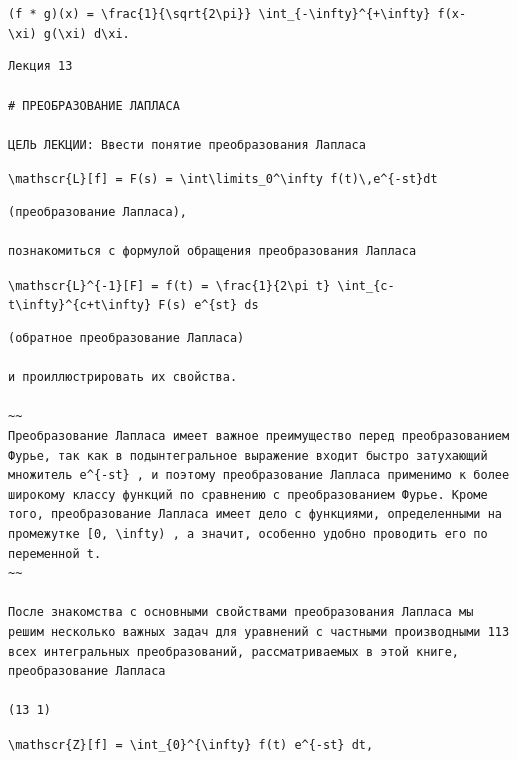 \documentclass[
  ukrainian,
]{article}
\begin{document}
\texttt{(f\ *\ g)(x)\ =\ \textbackslash{}frac\{1\}\{\textbackslash{}sqrt\{2\textbackslash{}pi\}\}\ \textbackslash{}int\_\{-\textbackslash{}infty\}\^{}\{+\textbackslash{}infty\}\ f(x-\textbackslash{}xi)\ g(\textbackslash{}xi)\ d\textbackslash{}xi.}

\begin{verbatim}
Лекция 13

# ПРЕОБРАЗОВАНИЕ ЛАПЛАСА

ЦЕЛЬ ЛЕКЦИИ: Ввести понятие преобразования Лапласа
\end{verbatim}

\texttt{\textbackslash{}mathscr\{L\}{[}f{]}\ =\ F(s)\ =\ \textbackslash{}int\textbackslash{}limits\_0\^{}\textbackslash{}infty\ f(t)\textbackslash{},e\^{}\{-st\}dt}

\begin{verbatim}
(преобразование Лапласа),

познакомиться с формулой обращения преобразования Лапласа
\end{verbatim}

\texttt{\textbackslash{}mathscr\{L\}\^{}\{-1\}{[}F{]}\ =\ f(t)\ =\ \textbackslash{}frac\{1\}\{2\textbackslash{}pi\ t\}\ \textbackslash{}int\_\{c-t\textbackslash{}infty\}\^{}\{c+t\textbackslash{}infty\}\ F(s)\ e\^{}\{st\}\ ds}

\begin{verbatim}
(обратное преобразование Лапласа)

и проиллюстрировать их свойства.

~~
Преобразование Лапласа имеет важное преимущество перед преобразованием Фурье, так как в подынтегральное выражение входит быстро затухающий множитель e^{-st} , и поэтому преобразование Лапласа применимо к более широкому классу функций по сравнению с преобразованием Фурье. Кроме того, преобразование Лапласа имеет дело с функциями, определенными на промежутке [0, \infty) , а значит, особенно удобно проводить его по переменной t.
~~

После знакомства с основными свойствами преобразования Лапласа мы решим несколько важных задач для уравнений с частными производными 113 всех интегральных преобразований, рассматриваемых в этой книге, преобразование Лапласа

(13 1)
\end{verbatim}

\texttt{\textbackslash{}mathscr\{Z\}{[}f{]}\ =\ \textbackslash{}int\_\{0\}\^{}\{\textbackslash{}infty\}\ f(t)\ e\^{}\{-st\}\ dt,}
\end{document}
